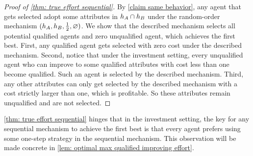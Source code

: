 \begin{proof}[Proof of \cref{thm: true effort sequential}]
   By \cref{claim same behavior}, any agent that gets selected adopt some attributes in $h_A\cap h_B$ under the random-order mechanism $(h_A,h_B,\frac12,\varnothing)$.
    We show that the described mechanism selects all potential qualified agents and zero unqualified agent, which achieves the first best.
   First, any qualified agent gets selected with zero cost under the described mechanism.
    Second, notice that under the investment setting, every unqualified agent who can improve to some qualified attributes with cost less than one become qualified.
    Such an agent is selected by the described mechanism.
    Third, any other attributes can only get selected by the described mechanism with a cost strictly larger than one, which is profitable.
    So these attributes remain unqualified and are not selected.
\end{proof}

\cref{thm: true effort sequential} hinges that in  the investment setting, the key for any sequential mechanism to achieve the first best is that every agent prefers using some one-step strategy in the sequential mechanism.
This observation will be made concrete in \cref{lem: optimal max qualified improving effort}.

